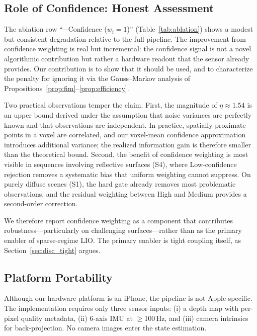 \subsection{Role of Confidence: Honest Assessment}
\label{sec:disc_confidence}

The ablation row ``$-$Confidence ($w_i = 1$)'' (Table~\ref{tab:ablation}) shows a modest but consistent degradation relative to the full pipeline. The improvement from confidence weighting is real but incremental: the confidence signal is not a novel algorithmic contribution but rather a hardware readout that the sensor already provides. Our contribution is to show that it should be used, and to characterize the penalty for ignoring it via the Gauss--Markov analysis of Propositions~\ref{prop:fim}--\ref{prop:efficiency}.

Two practical observations temper the claim. First, the magnitude of $\eta \approx 1.54$ is an upper bound derived under the assumption that noise variances are perfectly known and that observations are independent. In practice, spatially proximate points in a voxel are correlated, and our voxel-mean confidence approximation introduces additional variance; the realized information gain is therefore smaller than the theoretical bound. Second, the benefit of confidence weighting is most visible in sequences involving reflective surfaces (S4), where Low-confidence rejection removes a systematic bias that uniform weighting cannot suppress. On purely diffuse scenes (S1), the hard gate already removes most problematic observations, and the residual weighting between High and Medium provides a second-order correction.

We therefore report confidence weighting as a component that contributes robustness---particularly on challenging surfaces---rather than as the primary enabler of sparse-regime LIO. The primary enabler is tight coupling itself, as Section~\ref{sec:disc_tight} argues.

\subsection{Platform Portability}
\label{sec:disc_portability}

Although our hardware platform is an iPhone, the pipeline is not Apple-specific. The implementation requires only three sensor inputs: (i) a depth map with per-pixel quality metadata, (ii) 6-axis IMU at $\geq$100\,Hz, and (iii) camera intrinsics for back-projection. No camera images enter the state estimation.

